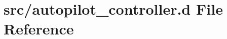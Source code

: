 \hypertarget{autopilot__controller_8d}{}\section{src/autopilot\+\_\+controller.d File Reference}
\label{autopilot__controller_8d}
